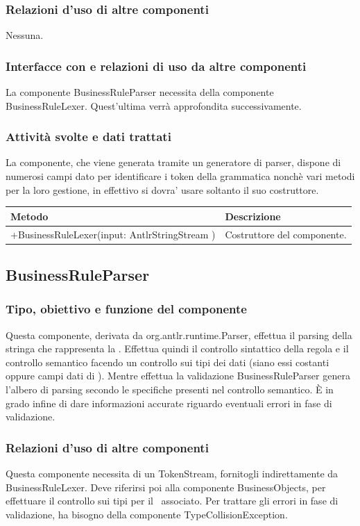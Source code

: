 \documentclass[11pt,titlepage,a4paper]{report}
\begin{document}
\subsubsection{Relazioni d'uso di altre componenti}
Nessuna.
\subsubsection{Interfacce con e relazioni di uso da altre componenti}
La componente BusinessRuleParser necessita della componente BusinessRuleLexer. Quest'ultima verr\`a approfondita successivamente.
\subsubsection{Attivit\`a svolte e dati trattati}
La componente, che viene generata tramite un generatore di parser, dispone di numerosi campi dato per identificare i token della grammatica nonch\`e vari metodi per la loro gestione, in effettivo si dovra' usare soltanto il suo costruttore.
\begin{center}
\begin{tabular}{||p{6cm}||p{6cm}||} \hline
\hline
Metodo & Descrizione \\  \hline
+BusinessRuleLexer(input: AntlrStringStream ) & Costruttore del componente.\\ \hline
\end{tabular}
\end{center}

\subsection{BusinessRuleParser}
\subsubsection{Tipo, obiettivo e funzione del componente}
Questa componente, derivata da org.antlr.runtime.Parser, effettua il parsing della stringa che rappresenta la \br. Effettua quindi il controllo sintattico della regola e il controllo semantico facendo un controllo sui tipi dei dati (siano essi costanti oppure campi dati di \bos). Mentre effettua la validazione BusinessRuleParser genera l'albero di parsing secondo le specifiche presenti nel controllo semantico. \`E in grado infine di dare informazioni accurate riguardo eventuali errori in fase di validazione.
\subsubsection{Relazioni d'uso di altre componenti}
Questa componente necessita di un TokenStream, fornitogli indirettamente da BusinessRuleLexer. Deve riferirsi poi alla componente BusinessObjects, per effettuare il controllo sui tipi per il \bo\ associato. Per trattare gli errori in fase di validazione, ha bisogno della componente TypeCollisionException.
\end{document}
